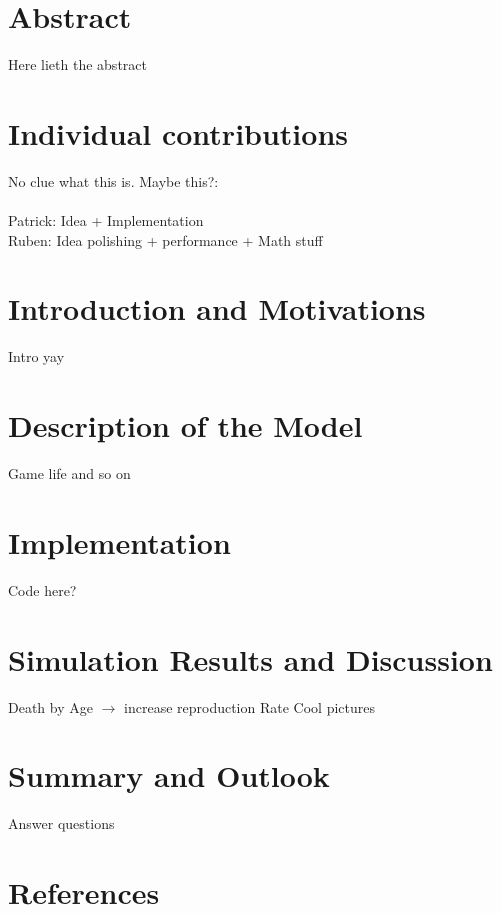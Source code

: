 \documentclass[11pt]{article}
\begin{document}
\section{Abstract}
Here lieth the abstract

\section{Individual contributions}
No clue what this is.
Maybe this?:\\ \\
Patrick: Idea + Implementation\\
Ruben: Idea polishing + performance + Math stuff

\section{Introduction and Motivations}
Intro yay

\section{Description of the Model}
Game life and so on

\section{Implementation}
Code here?

\section{Simulation Results and Discussion}
Death by Age $\rightarrow$ increase reproduction Rate
Cool pictures

\section{Summary and Outlook}
Answer questions

\section{References}
\end{document}
